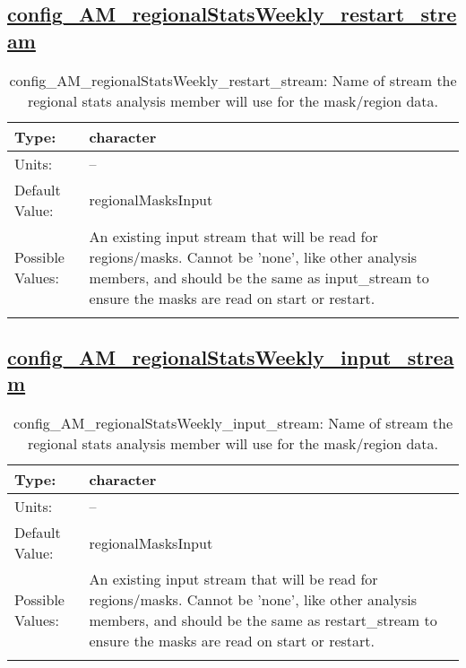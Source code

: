 \subsection[config\_AM\_regionalStatsWeekly\_restart\_stream]{\hyperref[sec:nm_tab_AM_regionalStatsWeekly]{config\_AM\_regionalStatsWeekly\_restart\_stream}}
\label{subsec:nm_sec_config_AM_regionalStatsWeekly_restart_stream}
\begin{center}
\begin{longtable}{| p{2.0in} || p{4.0in} |}
    \hline
    Type: & character \\
    \hline
    Units: & -- \\
    \hline
    Default Value: & regionalMasksInput \\
    \hline
    Possible Values: & An existing input stream that will be read for regions/masks. Cannot be 'none', like other analysis members, and should be the same as input\_stream to ensure the masks are read on start or restart. \\
    \hline
    \caption{config\_AM\_regionalStatsWeekly\_restart\_stream: Name of stream the regional stats analysis member will use for the mask/region data.}
\end{longtable}
\end{center}
\subsection[config\_AM\_regionalStatsWeekly\_input\_stream]{\hyperref[sec:nm_tab_AM_regionalStatsWeekly]{config\_AM\_regionalStatsWeekly\_input\_stream}}
\label{subsec:nm_sec_config_AM_regionalStatsWeekly_input_stream}
\begin{center}
\begin{longtable}{| p{2.0in} || p{4.0in} |}
    \hline
    Type: & character \\
    \hline
    Units: & -- \\
    \hline
    Default Value: & regionalMasksInput \\
    \hline
    Possible Values: & An existing input stream that will be read for regions/masks. Cannot be 'none', like other analysis members, and should be the same as restart\_stream to ensure the masks are read on start or restart. \\
    \hline
    \caption{config\_AM\_regionalStatsWeekly\_input\_stream: Name of stream the regional stats analysis member will use for the mask/region data.}
\end{longtable}
\end{center}

